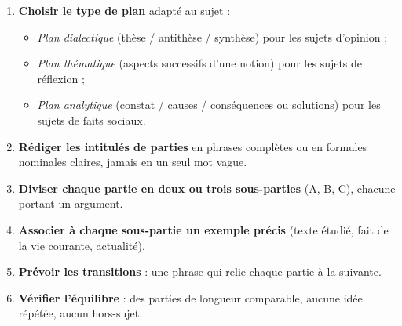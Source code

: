 \documentclass[11pt]{article}
\begin{document}
\begin{methode}
\begin{enumerate}
\item \textbf{Choisir le type de plan} adapté au sujet :
\begin{itemize}
\item \emph{Plan dialectique} (thèse / antithèse / synthèse) pour les sujets d'opinion ;
\item \emph{Plan thématique} (aspects successifs d'une notion) pour les sujets de réflexion ;
\item \emph{Plan analytique} (constat / causes / conséquences ou solutions) pour les sujets de faits sociaux.
\end{itemize}
\item \textbf{Rédiger les intitulés de parties} en phrases complètes ou en formules nominales claires, jamais en un seul mot vague.
\item \textbf{Diviser chaque partie en deux ou trois sous-parties} (A, B, C), chacune portant un argument.
\item \textbf{Associer à chaque sous-partie un exemple précis} (texte étudié, fait de la vie courante, actualité).
\item \textbf{Prévoir les transitions} : une phrase qui relie chaque partie à la suivante.
\item \textbf{Vérifier l'équilibre} : des parties de longueur comparable, aucune idée répétée, aucun hors-sujet.
\end{enumerate}
\end{methode}
\end{document}
